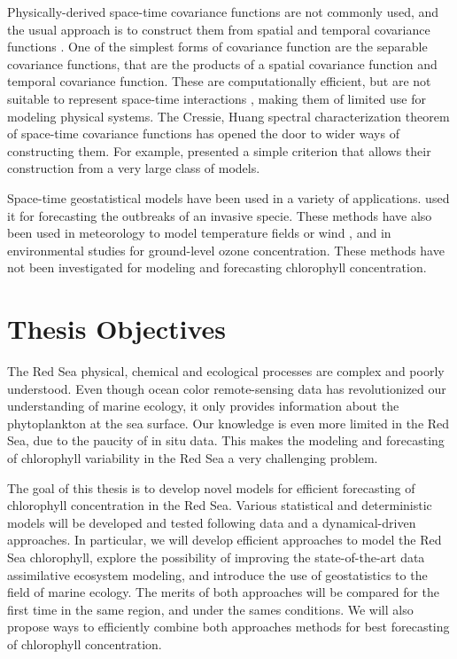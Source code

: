 Physically-derived space-time covariance functions are not commonly used, and
the usual approach is to construct them from spatial and temporal covariance
functions \citep{Gneiting2010}. One of the simplest forms of covariance
function are the separable covariance functions, that are the products of a
spatial covariance function and temporal covariance function. These are
computationally efficient, but are not suitable to represent space-time
interactions \citep{Cressie1999, Stein2005}, making them of limited use for
modeling physical systems. The Cressie, Huang spectral characterization theorem
of space-time covariance functions has opened the door to wider ways of
constructing them. For example, \citet{Gneiting2002} presented a simple
criterion that allows their construction from a very large class of models. 

Space-time geostatistical models have been used in a variety of applications.
\citet{Hohn1993} used it for forecasting the outbreaks of an invasive specie.
These methods have also been used in meteorology to model temperature fields
\citep{Handcock1994, North2011} or wind \citep{Cressie1999, Gneiting2002}, and
in environmental studies for ground-level ozone concentration.  These methods
have not been investigated for modeling and forecasting chlorophyll
concentration.

\section{Thesis Objectives}

The Red Sea physical, chemical and ecological processes are complex and poorly
understood. Even though ocean color remote-sensing data has revolutionized our
understanding of marine ecology, it only provides information about the
phytoplankton at the sea surface. Our knowledge is even more limited in the Red
Sea, due to the paucity of in situ data. This makes the modeling and
forecasting of chlorophyll variability in the Red Sea a very challenging
problem.

The goal of this thesis is to develop novel models for efficient forecasting of
chlorophyll concentration in the Red Sea. Various statistical and deterministic
models will be developed and
tested following data and a dynamical-driven approaches. In particular, we will
develop efficient approaches to model the Red Sea chlorophyll, explore the
possibility of improving the state-of-the-art data assimilative ecosystem
modeling, and introduce the use of geostatistics to the field of marine
ecology. The merits of both approaches will be compared for the first time in
the same region, and under the sames conditions. We will also propose ways to
efficiently combine both approaches methods for best forecasting of chlorophyll
concentration.

